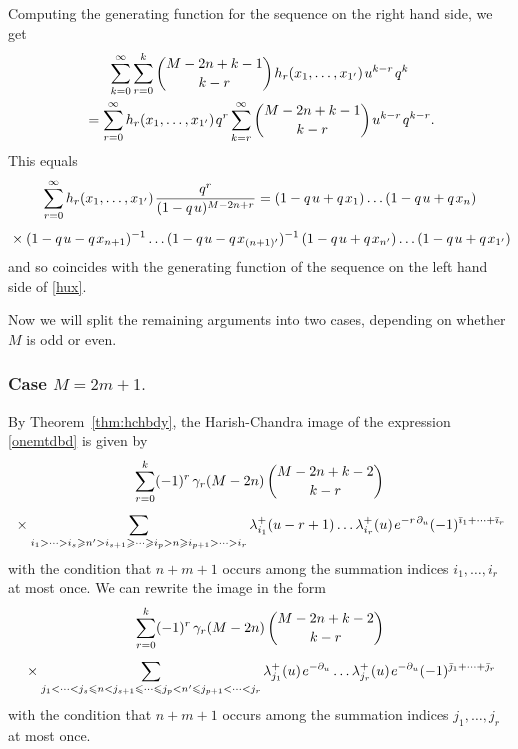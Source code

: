 \documentclass[12pt]{article}
\begin{document}
\bpf
Computing the generating function for the sequence on the right hand side, we get
\begin{multline}
\nonumber
\sum_{k=0}^{\infty}\sum_{r=0}^k\binom{M-2n+k-1}{k-r}\hspace{1pt} h_r(x_1,\dots,x_{1'})\hspace{1pt} u^{k-r}\hspace{1pt} q^k\\
{}=\sum_{r=0}^{\infty}h_r(x_1,\dots,x_{1'})\hspace{1pt} q^r\sum_{k=r}^{\infty}
\binom{M-2n+k-1}{k-r}\hspace{1pt} u^{k-r}\hspace{1pt} q^{k-r}.
\end{multline}
This equals
\begin{multline}
\nonumber
\sum_{r=0}^{\infty}h_r(x_1,\dots,x_{1'})\hspace{1pt} \frac{q^r}{(1-q\hspace{1pt} u)^{M-2n+r}}
=(1-q\hspace{1pt} u+q\hspace{1pt} x_1)\dots (1-q\hspace{1pt} u+q\hspace{1pt} x_n)\\[0.4em]
{}\times (1-q\hspace{1pt} u-q\hspace{1pt} x_{n+1})^{-1}\dots (1-q\hspace{1pt} u-q\hspace{1pt} x_{(n+1)'})^{-1}\,
(1-q\hspace{1pt} u+q\hspace{1pt} x_{n'})\dots (1-q\hspace{1pt} u+q\hspace{1pt} x_{1'})
\end{multline}
and so coincides with the generating function of the sequence
on the left hand side of \eqref{hux}.
\epf

Now we will split the remaining arguments into two cases, depending on whether $M$ is odd or even.



\subsubsection*{Case $M=2m+1.$}

By Theorem~\ref{thm:hchbdy}, the Harish-Chandra image of the
expression \eqref{onemtdbd} is given by
\begin{multline}
\sum_{r=0}^k(-1)^{r}\,\gamma_r(M-2n)\,\binom{M-2n+k-2}{k-r}\\[0.4em]
{}\times\sum_{i_1>\dots>i_s\geqslant n'>i_{s+1}\geqslant\dots\geqslant i_p>n\geqslant i_{p+1}>\dots>i_r}
\lambda^+_{i_1}(u-r+1)\dots \lambda^+_{i_r}(u)\hspace{1pt} e^{-r\hspace{1pt}\partial_u}(-1)^{\bar{\imath}_1+\dots+\bar{\imath}_r}
\nonumber
\end{multline}
with the condition that $n+m+1$ occurs among the summation indices $i_1,\dots,i_r$
at most once. We can rewrite the image in the form
\begin{multline}
\label{lahchb}
\sum_{r=0}^k(-1)^{r}\,\gamma_r(M-2n)\,\binom{M-2n+k-2}{k-r}\\[0.4em]
{}\times\sum_{j_1<\dots<j_s\leqslant n<j_{s+1}\leqslant\dots\leqslant j_p<n'\leqslant j_{p+1}<\dots<j_r}
\lambda^+_{j_1}(u)\hspace{1pt} e^{-\partial_u}\dots \lambda^+_{j_r}(u)\hspace{1pt} e^{-\partial_u}(-1)^{\bar{\jmath}_1+\dots+\bar{\jmath}_r}
\end{multline}
with the condition that $n+m+1$ occurs among the summation indices $j_1,\dots,j_r$
at most once.
\end{document}
